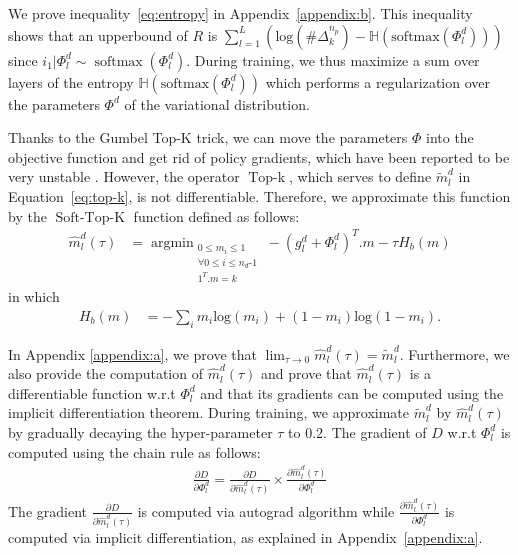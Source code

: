 \documentclass[11pt]{article}
\newcommand{\fyDone}[1]{\done[FY]\Todo[FY:]{\textcolor{orange}{#1}}}
\begin{document}
We prove inequality~\eqref{eq:entropy} in Appendix~\ref{appendix:b}.
This inequality shows that an upperbound of $R$ is $\sum_{l=1}^L(\text{log}(\#\Delta^{n_p}_k) - \mathbb{H}(\text{softmax}(\Phi_l^d)))$ since $i_1 | \Phi_l^d \sim \operatorname{softmax}(\Phi_l^d)$. During training, we thus maximize a sum over layers of the entropy $\mathbb{H}(\text{softmax}(\Phi_l^d))$\fyDone{Check sum} which performs a regularization over the parameters $\Phi^d$ of the variational distribution. 

Thanks to the Gumbel Top-K trick, we can move the parameters $\Phi$ into the objective function and get rid of policy gradients, which have been reported to be very unstable \citep{Diederick14auto}. However, the operator $\operatorname{Top-k}$, which serves to define $\tilde{m}_l^d$ in Equation~\eqref{eq:top-k}, is not differentiable. Therefore, we approximate this function by the $\operatorname{Soft-Top-K}$ function defined as follows:
\begin{align}\label{eq:soft-top-k}
\hat{m}_l^d(\tau) &= \displaystyle{\mathop{argmin}_{\substack{
                    0 \leqslant m_i \leqslant 1 \\
  \forall 0 \leqslant i \leqslant n_d\text{-}1 \\
        1^{T}.m = k
      }}} -(g_l^d+\Phi_l^d)^{T} . m - \tau H_b(m) 
\end{align}
in which
\begin{align}
H_b(m) &= - \sum_i m_i \text{log}(m_i) + (1-m_i)\text{log}(1-m_i). \nonumber 
\end{align}

In Appendix \ref{appendix:a}, we prove that $\lim_{\tau \rightarrow 0}\hat{m}_l^d(\tau) = \tilde{m}_l^d$. Furthermore, we also provide the computation of $\hat{m}_l^d(\tau)$ and prove that $\hat{m}_l^d(\tau)$ is a differentiable function w.r.t $\Phi_l^d$ and that its gradients can be computed using the implicit differentiation theorem. During training, we approximate $\tilde{m}_l^d$ by $\hat{m}_l^d(\tau)$ by gradually decaying the hyper-parameter $\tau$ to $0.2$. The gradient of $D$ w.r.t $\Phi_l^d$ is computed using the chain rule as follows:
\begin{align*}
\frac{\partial D}{\partial \Phi_l^d} = \frac{\partial D}{\partial \hat{m}_l^d(\tau)} \times \frac{\partial \hat{m}_l^d(\tau)}{\partial \Phi_l^d} 
\end{align*}
The gradient $\frac{\partial D}{\partial \hat{m}_l^d(\tau)}$ is computed via autograd algorithm while $\frac{\partial \hat{m}_l^d(\tau)}{\partial \Phi_l^d}$ is computed via implicit differentiation, as explained in Appendix~\ref{appendix:a}.
\end{document}
